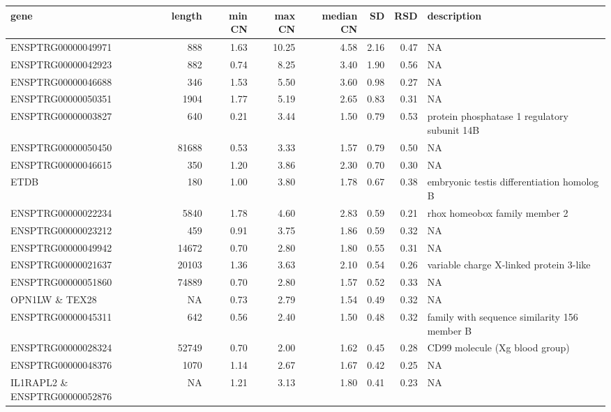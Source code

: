 \begin{table}[h]
\scriptsize
\centering
\begin{adjustbox}{angle=90}

\begin{tabular}{|l|r|r|r|r|r|r|l|}
\hline
\textbf{gene} & \textbf{length} & \textbf{min CN} & \textbf{max CN} & \textbf{median CN} & \textbf{SD} & \textbf{RSD} & \textbf{description} \\
\hline
ENSPTRG00000049971 & 888 & 1.63 & 10.25 & 4.58 & 2.16 & 0.47 & NA \\
ENSPTRG00000042923 & 882 & 0.74 & 8.25 & 3.40 & 1.90 & 0.56 & NA \\
ENSPTRG00000046688 & 346 & 1.53 & 5.50 & 3.60 & 0.98 & 0.27 & NA \\
ENSPTRG00000050351 & 1904 & 1.77 & 5.19 & 2.65 & 0.83 & 0.31 & NA \\
ENSPTRG00000003827 & 640 & 0.21 & 3.44 & 1.50 & 0.79 & 0.53 & protein phosphatase 1 regulatory subunit 14B  \\
ENSPTRG00000050450 & 81688 & 0.53 & 3.33 & 1.57 & 0.79 & 0.50 & NA \\
ENSPTRG00000046615 & 350 & 1.20 & 3.86 & 2.30 & 0.70 & 0.30 & NA \\
ETDB & 180 & 1.00 & 3.80 & 1.78 & 0.67 & 0.38 & embryonic testis differentiation homolog B  \\
ENSPTRG00000022234 & 5840 & 1.78 & 4.60 & 2.83 & 0.59 & 0.21 & rhox homeobox family member 2  \\
ENSPTRG00000023212 & 459 & 0.91 & 3.75 & 1.86 & 0.59 & 0.32 & NA \\
ENSPTRG00000049942 & 14672 & 0.70 & 2.80 & 1.80 & 0.55 & 0.31 & NA \\
ENSPTRG00000021637 & 20103 & 1.36 & 3.63 & 2.10 & 0.54 & 0.26 & variable charge X-linked protein 3-like  \\
ENSPTRG00000051860 & 74889 & 0.70 & 2.80 & 1.57 & 0.52 & 0.33 & NA \\
OPN1LW \& TEX28 & NA & 0.73 & 2.79 & 1.54 & 0.49 & 0.32 & NA \\
ENSPTRG00000045311 & 642 & 0.56 & 2.40 & 1.50 & 0.48 & 0.32 & family with sequence similarity 156 member B  \\
ENSPTRG00000028324 & 52749 & 0.70 & 2.00 & 1.62 & 0.45 & 0.28 & CD99 molecule (Xg blood group)  \\
ENSPTRG00000048376 & 1070 & 1.14 & 2.67 & 1.67 & 0.42 & 0.25 & NA \\
IL1RAPL2 \& ENSPTRG00000052876 & NA & 1.21 & 3.13 & 1.80 & 0.41 & 0.23 & NA \\

\end{tabular}
\end{adjustbox}
\end{table}
